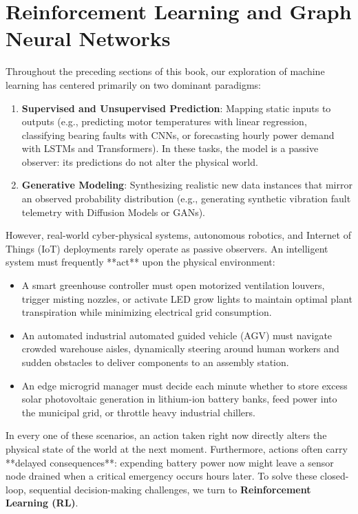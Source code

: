 \section{Reinforcement Learning and Graph Neural Networks}\label{sec:rl_gnn}

Throughout the preceding sections of this book, our exploration of machine learning has centered primarily on two dominant paradigms:
\begin{enumerate}
    \item \textbf{Supervised and Unsupervised Prediction}: Mapping static inputs to outputs (e.g., predicting motor temperatures with linear regression, classifying bearing faults with CNNs, or forecasting hourly power demand with LSTMs and Transformers). In these tasks, the model is a passive observer: its predictions do not alter the physical world.
    \item \textbf{Generative Modeling}: Synthesizing realistic new data instances that mirror an observed probability distribution (e.g., generating synthetic vibration fault telemetry with Diffusion Models or GANs).
\end{enumerate}

However, real-world cyber-physical systems, autonomous robotics, and Internet of Things (IoT) deployments rarely operate as passive observers. An intelligent system must frequently **act** upon the physical environment:
\begin{itemize}
    \item A smart greenhouse controller must open motorized ventilation louvers, trigger misting nozzles, or activate LED grow lights to maintain optimal plant transpiration while minimizing electrical grid consumption.
    \item An automated industrial automated guided vehicle (AGV) must navigate crowded warehouse aisles, dynamically steering around human workers and sudden obstacles to deliver components to an assembly station.
    \item An edge microgrid manager must decide each minute whether to store excess solar photovoltaic generation in lithium-ion battery banks, feed power into the municipal grid, or throttle heavy industrial chillers.
\end{itemize}

In every one of these scenarios, an action taken right now directly alters the physical state of the world at the next moment. Furthermore, actions often carry **delayed consequences**: expending battery power now might leave a sensor node drained when a critical emergency occurs hours later. To solve these closed-loop, sequential decision-making challenges, we turn to \textbf{Reinforcement Learning (RL)}.

